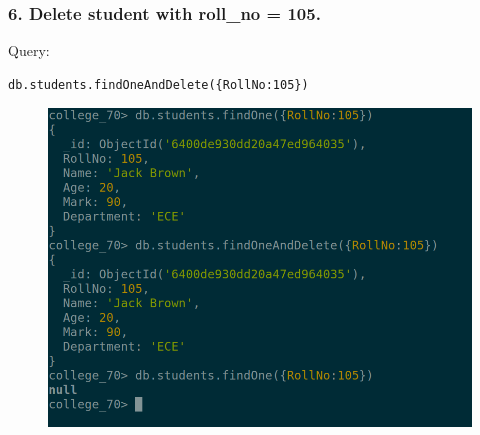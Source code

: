 \documentclass{article}
\begin{document}
\subsubsection*{6. Delete student with roll\_no = 105.}
Query:
\begin{Verbatim}[frame=single,framerule=1pt,fontfamily=courier,fontsize=\small]
db.students.findOneAndDelete({RollNo:105})
\end{Verbatim}
\begin{figure}[H]
    \centering
    \includegraphics[width=\textwidth]{cycle7/7.6.png}
\end{figure}
\end{document}
